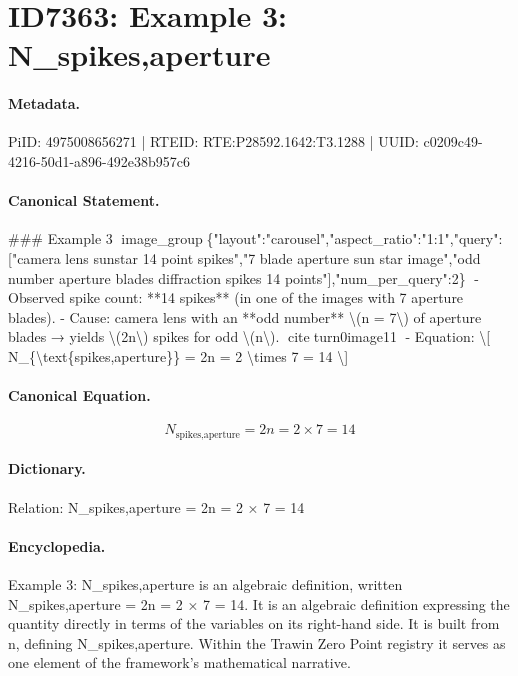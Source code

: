 \section*{ID7363: Example 3: N\_spikes,aperture}
\paragraph{Metadata.}
PiID: 4975008656271 | RTEID: RTE:P28592.1642:T3.1288 | UUID: c0209c49-4216-50d1-a896-492e38b957c6

\paragraph{Canonical Statement.}
\#\#\# Example 3 image\_group\{"layout":"carousel","aspect\_ratio":"1:1","query":["camera lens sunstar 14 point spikes","7 blade aperture sun star image","odd number aperture blades diffraction spikes 14 points"],"num\_per\_query":2\} - Observed spike count: **14 spikes** (in one of the images with 7 aperture blades). - Cause: camera lens with an **odd number** \textbackslash{}(n = 7\textbackslash{}) of aperture blades → yields \textbackslash{}(2n\textbackslash{}) spikes for odd \textbackslash{}(n\textbackslash{}). citeturn0image11 - Equation: \textbackslash{}[ N\_\{\textbackslash{}text\{spikes,aperture\}\} = 2n = 2 \textbackslash{}times 7 = 14 \textbackslash{}]

\paragraph{Canonical Equation.}
\[
N_{\text{spikes,aperture}} = 2n = 2 \times 7 = 14
\]

\paragraph{Dictionary.}
Relation: N\_spikes,aperture = 2n = 2 × 7 = 14

\paragraph{Encyclopedia.}
Example 3: N\_spikes,aperture is an algebraic definition, written N\_spikes,aperture = 2n = 2 × 7 = 14. It is an algebraic definition expressing the quantity directly in terms of the variables on its right-hand side. It is built from n, defining N\_spikes,aperture. Within the Trawin Zero Point registry it serves as one element of the framework's mathematical narrative.
